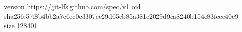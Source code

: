 version https://git-lfs.github.com/spec/v1
oid sha256:57f8b4bb2a7c6ec0c3307ec29d65cb85a381c2029d9ca8240b154e83feee40c9
size 128401
